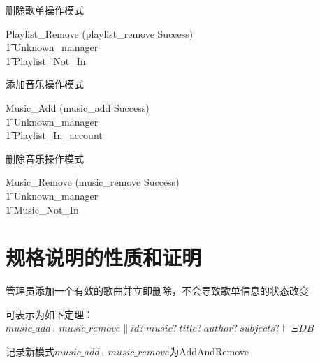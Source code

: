 \documentclass[14pt]{article}
\numberwithin{figure}{subsection}
\begin{document}
\begin{minipage}[t]{0.5\linewidth}
\begin{flushleft}
        删除歌单操作模式
        \begin{syntax}
            \hspace{-0.7cm}
            Playlist\_Remove   (playlist\_remove \wedge Success)\\
            \t1 \vee Unknown\_manager\\
            \t1 \vee Playlist\_Not\_In
        \end{syntax}


        添加音乐操作模式
        \begin{syntax}
            \hspace{-0.7cm}
            Music\_Add   (music\_add \wedge Success)\\
            \t1 \vee Unknown\_manager\\
            \t1 \vee Playlist\_In\_account
        \end{syntax}

        删除音乐操作模式
        \begin{syntax}
            \hspace{-0.7cm}
            Music\_Remove   (music\_remove \wedge Success)\\
            \t1 \vee Unknown\_manager\\
            \t1 \vee Music\_Not\_In
        \end{syntax}
    \end{flushleft}
\end{minipage}

\clearpage
\section{规格说明的性质和证明}
管理员添加一个有效的歌曲并立即删除，不会导致歌单信息的状态改变

可表示为如下定理：$music\_add \comp \ music\_remove \| id?\ music?\ title?\ author?\ subjects?
    \vDash \Xi DB$

记录新模式$music\_add \comp \ music\_remove$为AddAndRemove
\end{document}
